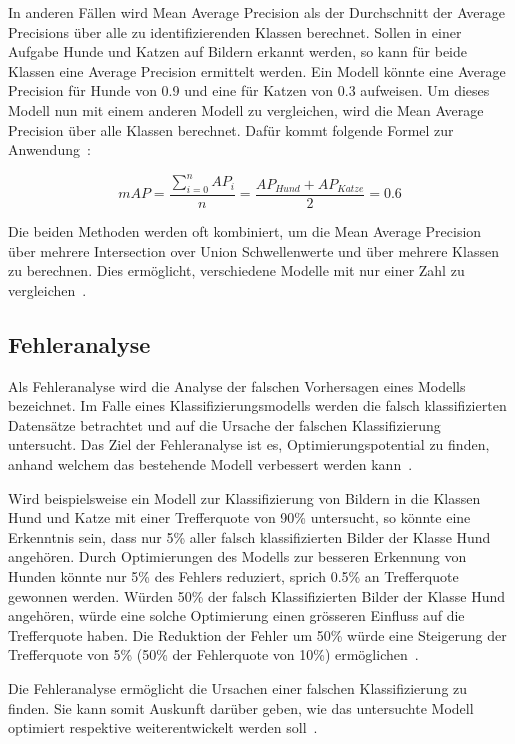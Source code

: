 In anderen Fällen wird Mean Average Precision als der Durchschnitt der Average Precisions über alle zu identifizierenden Klassen berechnet. Sollen in einer Aufgabe Hunde und Katzen auf Bildern erkannt werden, so kann für beide Klassen eine Average Precision ermittelt werden. Ein Modell könnte eine Average Precision für Hunde von 0.9 und eine für Katzen von 0.3 aufweisen. Um dieses Modell nun mit einem anderen Modell zu vergleichen, wird die Mean Average Precision über alle Klassen berechnet. Dafür kommt folgende Formel zur Anwendung~\autocite{AP}:

\nopagebreak
$$mAP = \frac{\sum_{i=0}^{n}AP_{i}}{n} = \frac{AP_{Hund}+AP_{Katze}}{2} = 0.6$$

Die beiden Methoden werden oft kombiniert, um die Mean Average Precision über mehrere Intersection over Union Schwellenwerte und über mehrere Klassen zu berechnen. Dies ermöglicht, verschiedene Modelle mit nur einer Zahl zu vergleichen~\autocite{AP}.

\subsection{Fehleranalyse}
\label{chap:error-analysis}

Als Fehleranalyse wird die Analyse der falschen Vorhersagen eines Modells bezeichnet. Im Falle eines Klassifizierungsmodells werden die falsch klassifizierten Datensätze betrachtet und auf die Ursache der falschen Klassifizierung untersucht. Das Ziel der Fehleranalyse ist es, Optimierungspotential zu finden, anhand welchem das bestehende Modell verbessert werden kann~\autocite{MLYearning}.

Wird beispielsweise ein Modell zur Klassifizierung von Bildern in die Klassen Hund und Katze mit einer Trefferquote von 90\% untersucht, so könnte eine Erkenntnis sein, dass nur 5\% aller falsch klassifizierten Bilder der Klasse Hund angehören. Durch Optimierungen des Modells zur besseren Erkennung von Hunden könnte nur 5\% des Fehlers reduziert, sprich 0.5\% an Trefferquote gewonnen werden. Würden 50\% der falsch Klassifizierten Bilder der Klasse Hund angehören, würde eine solche Optimierung einen grösseren Einfluss auf die Trefferquote haben. Die Reduktion der Fehler um 50\% würde eine Steigerung der Trefferquote von 5\% (50\% der Fehlerquote von 10\%) ermöglichen~\autocite{MLYearning}.

Die Fehleranalyse ermöglicht die Ursachen einer falschen Klassifizierung zu finden. Sie kann somit Auskunft darüber geben, wie das untersuchte Modell optimiert respektive weiterentwickelt werden soll~\autocite{MLYearning}.

